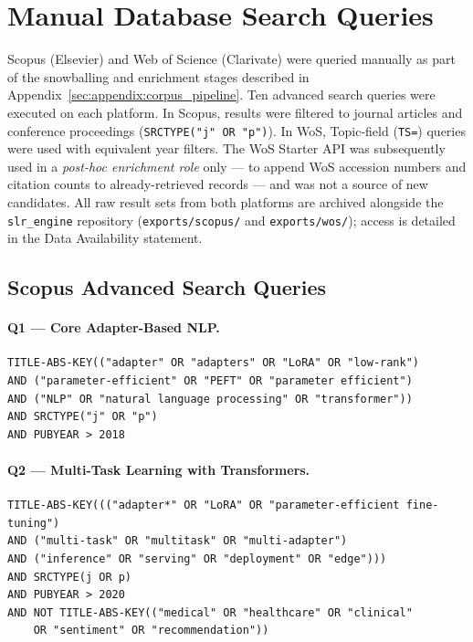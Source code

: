
\section[\appendixname~\thesection]{Manual Database Search Queries}
\label{app:db_queries}

Scopus (Elsevier) and Web of Science (Clarivate) were queried manually as part of the
snowballing and enrichment stages described in Appendix~\ref{sec:appendix:corpus_pipeline}.
Ten advanced search queries were executed on each platform. In Scopus, results were
filtered to journal articles and conference proceedings (\texttt{SRCTYPE("j" OR "p")}).
In WoS, Topic-field (\texttt{TS=}) queries were used with equivalent year filters.
The WoS Starter API was subsequently used in a \textit{post-hoc enrichment role} only
--- to append WoS accession numbers and citation counts to already-retrieved records ---
and was not a source of new candidates. All raw result sets from both platforms are
archived alongside the \texttt{slr\_engine} repository (\texttt{exports/scopus/} and
\texttt{exports/wos/}); access is detailed in the Data Availability statement.

\subsection*{Scopus Advanced Search Queries}
\label{app:db_queries:scopus}

\paragraph{Q1 — Core Adapter-Based NLP.}
\begin{verbatim}
TITLE-ABS-KEY(("adapter" OR "adapters" OR "LoRA" OR "low-rank")
AND ("parameter-efficient" OR "PEFT" OR "parameter efficient")
AND ("NLP" OR "natural language processing" OR "transformer"))
AND SRCTYPE("j" OR "p")
AND PUBYEAR > 2018
\end{verbatim}

\paragraph{Q2 — Multi-Task Learning with Transformers.}
\begin{verbatim}
TITLE-ABS-KEY((("adapter*" OR "LoRA" OR "parameter-efficient fine-tuning")
AND ("multi-task" OR "multitask" OR "multi-adapter")
AND ("inference" OR "serving" OR "deployment" OR "edge")))
AND SRCTYPE(j OR p)
AND PUBYEAR > 2020
AND NOT TITLE-ABS-KEY(("medical" OR "healthcare" OR "clinical"
    OR "sentiment" OR "recommendation"))
\end{verbatim}

